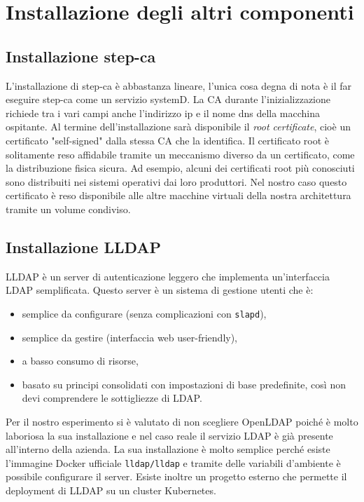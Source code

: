 \documentclass[12pt,a4paper]{report}
\begin{document}
\chapter{Installazione degli altri componenti}
\section{Installazione step-ca}
L'installazione di step-ca è abbastanza lineare, l'unica cosa degna di nota è il far eseguire step-ca come un servizio systemD. La CA durante l'inizializzazione richiede tra i vari campi anche l'indirizzo ip e il nome dns della macchina ospitante. Al termine dell'installazione sarà disponibile il \textit{root certificate}, cioè un certificato "self-signed" dalla stessa CA che la identifica. Il certificato root è solitamente reso affidabile tramite un meccanismo diverso da un certificato, come la distribuzione fisica sicura. Ad esempio, alcuni dei certificati root più conosciuti sono distribuiti nei sistemi operativi dai loro produttori.
Nel nostro caso questo certificato è reso disponibile alle altre macchine virtuali della nostra architettura tramite un volume condiviso.

\section{Installazione LLDAP}
LLDAP è un server di autenticazione leggero che implementa un'interfaccia LDAP semplificata. Questo server è un sistema di gestione utenti che è:
\begin{itemize}
    \item semplice da configurare (senza complicazioni con \texttt{slapd}),
    \item semplice da gestire (interfaccia web user-friendly),
    \item a basso consumo di risorse,
    \item basato su principi consolidati con impostazioni di base predefinite, così non devi comprendere le sottigliezze di LDAP.
\end{itemize}
Per il nostro esperimento si è valutato di non scegliere OpenLDAP poiché è molto laboriosa la sua installazione e nel caso reale il servizio LDAP è già presente all'interno della azienda.
La sua installazione è molto semplice perché esiste l'immagine Docker ufficiale \texttt{lldap/lldap} e tramite delle variabili d'ambiente è possibile configurare il server.
Esiste inoltre un progetto esterno che permette il deployment di LLDAP su un cluster Kubernetes. 
\end{document}
